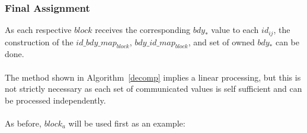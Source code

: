 \documentclass{article}
\begin{document}
\subsubsection {Final Assignment}
As each respective $block$ receives the corresponding $bdy_*$ value to each $id_{ij}$,
the construction of the $id\_bdy\_map_{block}$, $bdy\_id\_map_{block}$, and set of
owned $bdy_*$ can be done.\\
\\
The method shown in Algorithm~\ref{decomp} implies a linear processing, but this
is not strictly necessary as each set of communicated values is self sufficient
and can be processed independently.\\
\\
As before, $block_a$ will be used first as an example:
\\\\
\end{document}
